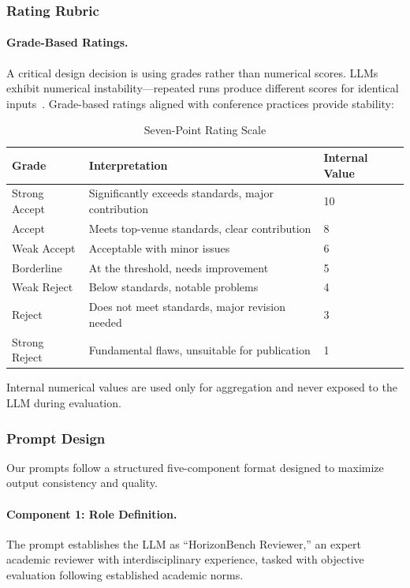 \subsubsection{Rating Rubric}

\paragraph{Grade-Based Ratings.} A critical design decision is using grades rather than numerical scores. LLMs exhibit numerical instability---repeated runs produce different scores for identical inputs~\cite{zhou2024llm}. Grade-based ratings aligned with conference practices provide stability:

\begin{table}[h]
\centering
\caption{Seven-Point Rating Scale}
\label{tab:rating_scale}
\small
\begin{tabular}{@{}lll@{}}
\toprule
\textbf{Grade} & \textbf{Interpretation} & \textbf{Internal Value} \\
\midrule
Strong Accept & Significantly exceeds standards, major contribution & 10 \\
Accept & Meets top-venue standards, clear contribution & 8 \\
Weak Accept & Acceptable with minor issues & 6 \\
Borderline & At the threshold, needs improvement & 5 \\
Weak Reject & Below standards, notable problems & 4 \\
Reject & Does not meet standards, major revision needed & 3 \\
Strong Reject & Fundamental flaws, unsuitable for publication & 1 \\
\bottomrule
\end{tabular}
\end{table}

Internal numerical values are used only for aggregation and never exposed to the LLM during evaluation.

\subsubsection{Prompt Design}

Our prompts follow a structured five-component format designed to maximize output consistency and quality.

\paragraph{Component 1: Role Definition.} The prompt establishes the LLM as ``HorizonBench Reviewer,'' an expert academic reviewer with interdisciplinary experience, tasked with objective evaluation following established academic norms.

